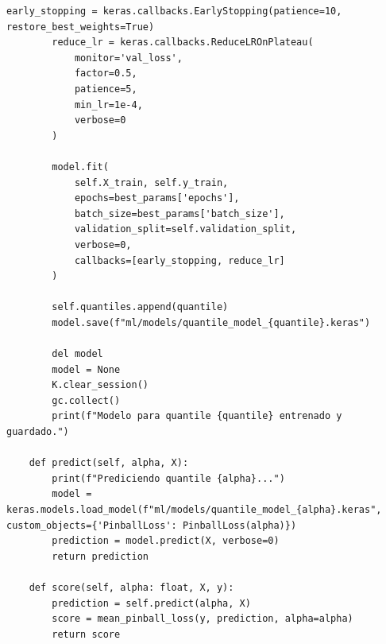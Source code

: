 \documentclass[11pt]{book}
\theoremstyle{plain} %
\theoremstyle{definition} %
\begin{document}
\begin{lstlisting}[style=pythonstyle, caption=neuralnetwork.py]
        early_stopping = keras.callbacks.EarlyStopping(patience=10, restore_best_weights=True)
        reduce_lr = keras.callbacks.ReduceLROnPlateau(
            monitor='val_loss',
            factor=0.5,
            patience=5,
            min_lr=1e-4,
            verbose=0
        )
                
        model.fit(
            self.X_train, self.y_train,
            epochs=best_params['epochs'],
            batch_size=best_params['batch_size'],
            validation_split=self.validation_split,
            verbose=0,
            callbacks=[early_stopping, reduce_lr]
        )

        self.quantiles.append(quantile)
        model.save(f"ml/models/quantile_model_{quantile}.keras")

        del model
        model = None
        K.clear_session()
        gc.collect()
        print(f"Modelo para quantile {quantile} entrenado y guardado.")

    def predict(self, alpha, X):        
        print(f"Prediciendo quantile {alpha}...")
        model = keras.models.load_model(f"ml/models/quantile_model_{alpha}.keras", custom_objects={'PinballLoss': PinballLoss(alpha)})
        prediction = model.predict(X, verbose=0)
        return prediction

    def score(self, alpha: float, X, y):
        prediction = self.predict(alpha, X)
        score = mean_pinball_loss(y, prediction, alpha=alpha)
        return score

 \end{lstlisting}
\end{document}
